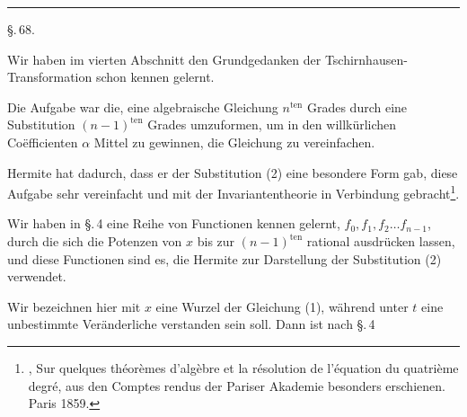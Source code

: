 
\begin{center}


\rule{4cm}{0.4pt}

\S.\,68.

\end{center}

Wir haben im vierten Abschnitt den Grundgedanken der
Tschirnhausen-Transformation schon kennen gelernt.

Die Aufgabe war die, eine algebraische Gleichung $n^{\text{ten}}$
Grades
durch eine Substitution $(n-1)^{\text{ten}}$ Grades
umzuformen, um in den willk\"urlichen Co\"efficienten $\alpha$ Mittel zu
gewinnen, die Gleichung zu vereinfachen.

Hermite hat dadurch, dass er der Substitution (2) eine
besondere Form gab, diese Aufgabe sehr vereinfacht und mit
der Invariantentheorie in Verbindung gebracht\footnote{, Sur quelques th\'eor\`emes d'alg\`ebre et la r\'esolution de
l'\'equation du quatri\`eme degr\'e, aus den Comptes rendus der Pariser Akademie besonders erschienen. Paris 1859.}.

Wir haben in \S.\,4 eine Reihe von Functionen kennen gelernt,
$f_0, f_1, f_2 \ldots f_{n-1}$, durch die sich die Potenzen von $x$ bis zur
$(n-1)^{\text{ten}}$ rational ausdr\"ucken lassen, und diese Functionen sind
es, die Hermite zur Darstellung der Substitution (2) verwendet.

Wir bezeichnen hier mit $x$ eine Wurzel der Gleichung (1),
w\"ahrend unter $t$ eine unbestimmte Ver\"anderliche verstanden sein
soll. Dann ist nach \S.\,4
